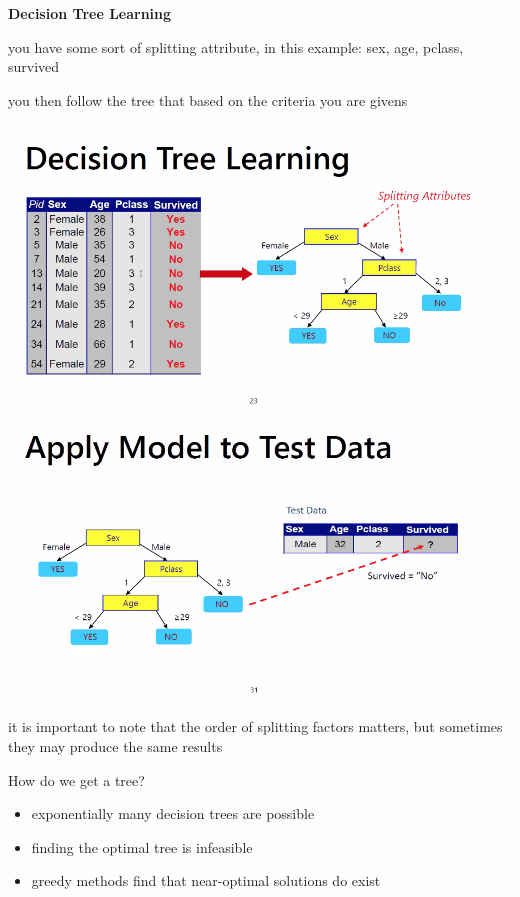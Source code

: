 \documentclass[12pt]{article}
\begin{document}
	\newpage \vfill
	\textbf{\centering Decision Tree Learning}
	\begin{itemize}
		\item you have some sort of splitting attribute, in this example: sex, age, pclass, survived 
		\item you then follow the tree that based on the criteria you are givens
		
		{\centering \includegraphics [scale=.5] {decisiontree.png} \includegraphics[scale=.5]{appliedmodel.png}
		\item it is important to note that the order of splitting factors matters, but sometimes they may produce the same results}
		\item How do we get a tree? 
			\begin{itemize}
				\item exponentially many decision trees are possible 
				\item finding the optimal tree is infeasible
				\item greedy methods find that near-optimal solutions do exist 
				\begin{itemize}

\end{itemize}
\end{itemize}
\end{itemize}
\end{document}
